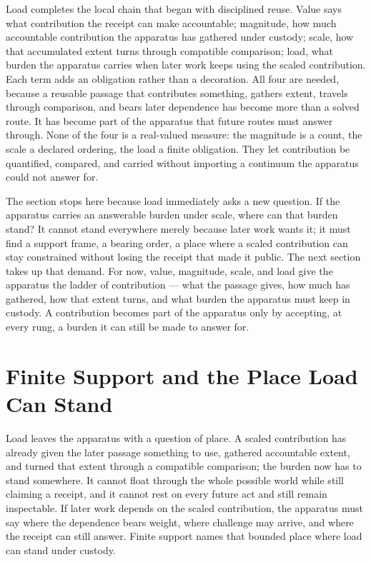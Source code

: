 Load completes the local chain that began with disciplined reuse. Value says what contribution the receipt can make accountable; magnitude, how much accountable contribution the apparatus has gathered under custody; scale, how that accumulated extent turns through compatible comparison; load, what burden the apparatus carries when later work keeps using the scaled contribution. Each term adds an obligation rather than a decoration. All four are needed, because a reusable passage that contributes something, gathers extent, travels through comparison, and bears later dependence has become more than a solved route. It has become part of the apparatus that future routes must answer through. None of the four is a real-valued measure: the magnitude is a count, the scale a declared ordering, the load a finite obligation. They let contribution be quantified, compared, and carried without importing a continuum the apparatus could not answer for.

The section stops here because load immediately asks a new question. If the apparatus carries an answerable burden under scale, where can that burden stand? It cannot stand everywhere merely because later work wants it; it must find a support frame, a bearing order, a place where a scaled contribution can stay constrained without losing the receipt that made it public. The next section takes up that demand. For now, value, magnitude, scale, and load give the apparatus the ladder of contribution --- what the passage gives, how much has gathered, how that extent turns, and what burden the apparatus must keep in custody. A contribution becomes part of the apparatus only by accepting, at every rung, a burden it can still be made to answer for.

\section{Finite Support and the Place Load Can Stand}

Load leaves the apparatus with a question of place. A scaled contribution has already given the later passage something to use, gathered accountable extent, and turned that extent through a compatible comparison; the burden now has to stand somewhere. It cannot float through the whole possible world while still claiming a receipt, and it cannot rest on every future act and still remain inspectable. If later work depends on the scaled contribution, the apparatus must say where the dependence bears weight, where challenge may arrive, and where the receipt can still answer. Finite support names that bounded place where load can stand under custody.


